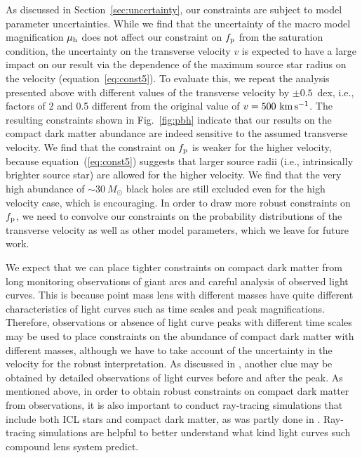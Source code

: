 \documentclass[showpacs,twocolumn,preprintnumbers,amsmath,amssymb,superscriptaddress,nofootinbib]{revtex4}
\newcommand{\morv}[1]{#1}
\begin{document}
\morv{As discussed in Section~\ref{sec:uncertainty}, our constraints
  are subject to model parameter uncertainties. While we find that the
uncertainty of the macro model magnification $\mu_{\rm h}$ does not
affect our constraint on $f_{\rm p}$ from the saturation condition,
the uncertainty on the transverse velocity $v$ is expected to have a
large impact on our result via the dependence of the maximum source
star radius on the velocity (equation~\ref{eq:const5}). To evaluate
this, we repeat the analysis presented above with different values of
the transverse velocity by $\pm 0.5$~dex, i.e., factors of 2 and 0.5
different from the original value of $v=500~{\rm km\,s^{-1}}$. The
resulting constraints shown in Fig.~\ref{fig:pbh} indicate that our
results on the compact dark matter abundance are indeed sensitive to
the assumed transverse velocity. We find that the constraint on
$f_{\rm p}$ is weaker for the higher velocity, because
equation~(\ref{eq:const5}) suggests that larger source radii (i.e.,
intrinsically brighter source star) are allowed for the higher
velocity. We find that the very high abundance of $\sim 30~M_\odot$
black holes are still excluded even for the high velocity case, which
is encouraging. In order to draw more robust constraints on $f_{\rm
  p}$, we need to convolve our constraints on the probability
distributions of the transverse velocity as well as other model
parameters, which we leave for future work.}

We expect that we can place tighter constraints on compact dark matter
from long monitoring observations of giant arcs and careful analysis of
observed light curves. This is because point mass lens with different
masses have quite different characteristics of light curves such as
time scales and peak magnifications. Therefore, observations or
absence of light curve peaks with different time scales may be used to
place constraints on the abundance of compact dark matter with
different masses, although we have to take account of the uncertainty
in the velocity for the robust interpretation. As discussed in
\cite{Diego:2017drh}, another clue may be obtained by detailed
observations of light curves before and after the peak.
As mentioned above, in order to obtain robust constraints on compact
dark matter from observations, it is also important to conduct
ray-tracing simulations that include both ICL stars and compact dark
matter, as was partly done in \cite{Diego:2017drh}. Ray-tracing
simulations are helpful to better understand what kind light curves
such compound lens system predict.  
\end{document}
